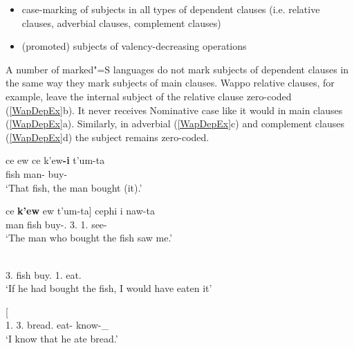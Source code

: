 \begin{itemize}
\item case-marking of subjects in all types of dependent clauses (i.e. relative clauses, adverbial clauses, complement clauses)
\item (promoted) subjects of valency-decreasing operations
\end{itemize}

A number of marked"=S languages do not mark subjects of dependent clauses in the same way they mark subjects of main clauses.
Wappo relative clauses, for example, leave the internal subject of the relative clause  zero-coded (\ref{WapDepEx}b). 
It never receives Nominative case like it would in main clauses (\ref{WapDepEx}a). Similarly, in adverbial (\ref{WapDepEx}c) and complement clauses (\ref{WapDepEx}d) the subject remains zero-coded.

\begin{exe}\ex\label{WapDepEx} 
\begin{xlist}
\ex\gll ce ew ce k'ew\textbf{-i} t'um-ta\textglotstop\\
\dem{} fish \dem{} man-\nom{} buy-\pst{}\\
\glt `That fish, the man bought (it).'

\ex \gll  {\rm[}ce \textbf{k'ew} ew t'um-ta{\rm]} cephi i naw-ta\textglotstop\\
          \hspaceThis{[}\dem{} man fish buy-\pst{}.\dep{} 3\sg{}.\nom{} 1\sg{}.\acc{} see-\pst{}\\
\glt `The man who bought the fish saw me.'

\ex\label{WapCondCl}\gll  {\rm[}    \textipa{cel'}{\rm]}    \\
                          \hspaceThis{[}3\sg{}.\acc{} \dem{} fish buy.\dep{} \cond{} \opt{} 1\sg{}.\nom{} \dem{} eat.\Hyp{}\\
`If he had bought the fish, I would have eaten it' %

\ex\gll{}  {\rm[}\textbf{}  \textipa{pa\textglotstop-tah}{\rm]} \\
       1\sg{}.\nom{} \hspaceThis{[}3\sg{}.\acc{} bread.\acc{} eat-\pst{} know-\neu{}\_\fut{}\\
\glt `I know that he ate bread.' 
\end{xlist} 
\end{exe}

